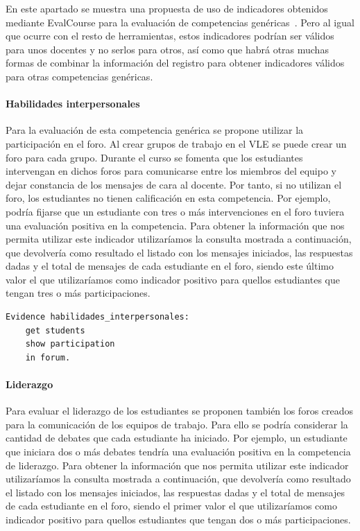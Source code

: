 			En este apartado se muestra una propuesta de uso de indicadores obtenidos mediante EvalCourse para la evaluación de competencias genéricas~\cite{Balderas:2015}. Pero al igual que ocurre con el resto de herramientas, estos indicadores podrían ser válidos para unos docentes y no serlos para otros, así como que habrá otras muchas formas de combinar la información del registro para obtener indicadores válidos para otras competencias genéricas.

				\paragraph*{Habilidades interpersonales}
				Para la evaluación de esta competencia genérica se propone utilizar la participación en el foro. Al crear grupos de trabajo en el VLE se puede crear un foro para cada grupo. Durante el curso se fomenta que los estudiantes intervengan en dichos foros para comunicarse entre los miembros del equipo y dejar constancia de los mensajes de cara al docente. Por tanto, si no utilizan el foro, los estudiantes no tienen calificación en esta competencia. Por ejemplo, podría fijarse que un estudiante con tres o más intervenciones en el foro tuviera una evaluación positiva en la competencia. Para obtener la información que nos permita utilizar este indicador utilizaríamos la consulta mostrada a continuación, que devolvería como resultado el listado con los mensajes iniciados, las respuestas dadas y el total de mensajes de cada estudiante en el foro, siendo este último valor el que utilizaríamos como indicador positivo para quellos estudiantes que tengan tres o más participaciones.

\begin{verbatim}
Evidence habilidades_interpersonales: 
	get students
	show participation
	in forum.
\end{verbatim}

				\paragraph*{Liderazgo}
				Para evaluar el liderazgo de los estudiantes se proponen también los foros creados para la comunicación de los equipos de trabajo. Para ello se podría considerar la cantidad de debates que cada estudiante ha iniciado. Por ejemplo, un estudiante que iniciara dos o más debates tendría una evaluación positiva en la competencia de liderazgo. Para obtener la información que nos permita utilizar este indicador utilizaríamos la consulta mostrada a continuación, que devolvería como resultado el listado con los mensajes iniciados, las respuestas dadas y el total de mensajes de cada estudiante en el foro, siendo el primer valor el que utilizaríamos como indicador positivo para quellos estudiantes que tengan dos o más participaciones.

